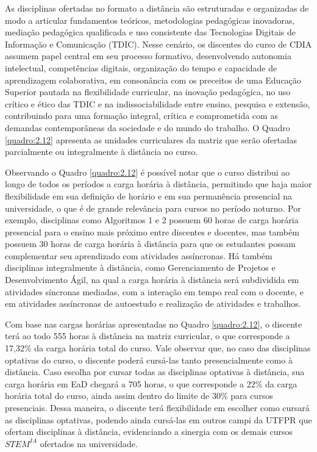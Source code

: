As disciplinas ofertadas no formato a distância são estruturadas e organizadas de modo a articular fundamentos teóricos, metodologias pedagógicas inovadoras, mediação pedagógica qualificada e uso consistente das Tecnologias Digitais de Informação e Comunicação (TDIC). Nesse cenário, os discentes do curso de CDIA assumem papel central em seu processo formativo, desenvolvendo autonomia intelectual, competências digitais, organização do tempo e capacidade de aprendizagem colaborativa, em consonância com os preceitos de uma Educação Superior pautada na flexibilidade curricular, na inovação pedagógica, no uso crítico e ético das TDIC e na indissociabilidade entre ensino, pesquisa e extensão, contribuindo para uma formação integral, crítica e comprometida com as demandas contemporâneas da sociedade e do mundo do trabalho. O Quadro \ref{quadro:2.12} apresenta as unidades curriculares da matriz que serão ofertadas parcialmente ou integralmente à distância no curso.

Observando o Quadro \ref{quadro:2.12} é possível notar que o curso distribui ao longo de todos os períodos a carga horária à distância, permitindo que haja maior flexibilidade em sua definição de horário e em sua permanência presencial na universidade, o que é de grande relevância para cursos no período noturno. Por exemplo, disciplinas como Algoritmos 1 e 2 possuem 60 horas de carga horária presencial para o ensino mais próximo entre discentes e docentes, mas também possuem 30 horas de carga horária à distância para que os estudantes possam complementar seu aprendizado com atividades assíncronas. Há também disciplinas integralmente à distância, como Gerenciamento de Projetos e Desenvolvimento Ágil, na qual a carga horária à distância será subdividida em atividades síncronas mediadas, com a interação em tempo real com o docente, e em atividades assíncronas de autoestudo e realização de atividades e trabalhos.

Com base nas cargas horárias apresentadas no Quadro \ref{quadro:2.12}, o discente terá ao todo 555 horas à distância na matriz curricular, o que corresponde a 17,32\% da carga horária total do curso. Vale observar que, no caso das disciplinas optativas do curso, o discente poderá cursá-las tanto presencialmente como à distância. Caso escolha por cursar todas as disciplinas optativas à distância, sua carga horária em EaD chegará a 705 horas, o que corresponde a 22\% da carga horária total do curso, ainda assim dentro do limite de 30\% para cursos presenciais. Dessa maneira, o discente terá flexibilidade em escolher como cursará as disciplinas optativas, podendo ainda cursá-las em outros campi da UTFPR que ofertam disciplinas à distância, evidenciando a sinergia com os demais cursos $STEM^{IA}$ ofertados na universidade.

